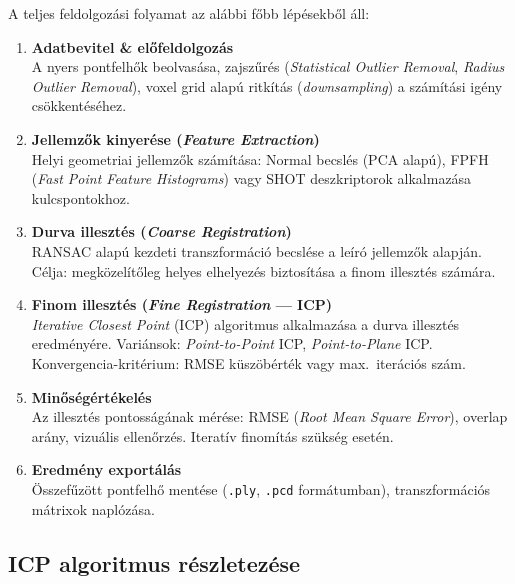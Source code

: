 \documentclass[12pt,a4paper]{article}
\begin{document}
A teljes feldolgozási folyamat az alábbi főbb lépésekből áll:

\begin{enumerate}
  \item \textbf{Adatbevitel \& előfeldolgozás} \\
    A nyers pontfelhők beolvasása, zajszűrés (\textit{Statistical Outlier Removal}, \textit{Radius Outlier Removal}), voxel grid alapú ritkítás (\textit{downsampling}) a számítási igény csökkentéséhez.

  \item \textbf{Jellemzők kinyerése (\textit{Feature Extraction})} \\
    Helyi geometriai jellemzők számítása: Normal becslés (PCA alapú), FPFH (\textit{Fast Point Feature Histograms}) vagy SHOT deszkriptorok alkalmazása kulcspontokhoz.

  \item \textbf{Durva illesztés (\textit{Coarse Registration})} \\
    RANSAC alapú kezdeti transzformáció becslése a leíró jellemzők alapján. Célja: megközelítőleg helyes elhelyezés biztosítása a finom illesztés számára.

  \item \textbf{Finom illesztés (\textit{Fine Registration} --- ICP)} \\
    \textit{Iterative Closest Point} (ICP) algoritmus alkalmazása a durva illesztés eredményére. Variánsok: \textit{Point-to-Point} ICP, \textit{Point-to-Plane} ICP. Konvergencia-kritérium: RMSE küszöbérték vagy max.\ iterációs szám.

  \item \textbf{Minőségértékelés} \\
    Az illesztés pontosságának mérése: RMSE (\textit{Root Mean Square Error}), overlap arány, vizuális ellenőrzés. Iteratív finomítás szükség esetén.

  \item \textbf{Eredmény exportálás} \\
    Összefűzött pontfelhő mentése (\texttt{.ply}, \texttt{.pcd} formátumban), transzformációs mátrixok naplózása.
\end{enumerate}

\subsection{ICP algoritmus részletezése}
\end{document}
